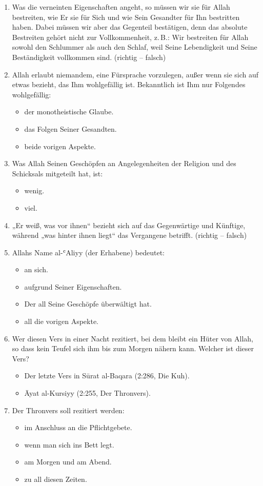 \begin{enumerate}[leftmargin=1.6em,resume]
\begin{itemize}
  \end{itemize}
\item Was die verneinten Eigenschaften angeht, so müssen wir sie für Allah bestreiten, wie Er sie
  für Sich und wie Sein Gesandter  für Ihn bestritten haben. Dabei müssen wir aber das
  Gegenteil bestätigen, denn das absolute Bestreiten gehört nicht zur Vollkommenheit, z.\,B.:
  Wir bestreiten für Allah sowohl den Schlummer als auch den Schlaf, weil Seine Lebendigkeit
  und Seine Beständigkeit vollkommen sind. (richtig -- falsch)
\item Allah erlaubt niemandem, eine Fürsprache vorzulegen, außer wenn sie sich auf etwas
  bezieht, das Ihm wohlgefällig ist. Bekanntlich ist Ihm nur Folgendes wohlgefällig:
  \begin{itemize}
    \item der monotheistische Glaube.
    \item das Folgen Seiner Gesandten.
    \item beide vorigen Aspekte.
  \end{itemize}
\item Was Allah Seinen Geschöpfen an Angelegenheiten der Religion und des Schicksals
  mitgeteilt hat, ist:
  \begin{itemize}
    \item wenig. \item viel.
  \end{itemize}
\item „Er weiß, was vor ihnen“ bezieht sich auf das Gegenwärtige und Künftige, während „was
  hinter ihnen liegt“ das Vergangene betrifft. (richtig -- falsch)
\item Allahs Name al-ʿAliyy (der Erhabene) bedeutet:
  \begin{itemize}
    \item an sich.
    \item aufgrund Seiner Eigenschaften.
    \item Der all Seine Geschöpfe überwältigt hat.
    \item all die vorigen Aspekte.
  \end{itemize}
\item Wer diesen Vers in einer Nacht rezitiert, bei dem bleibt ein Hüter von Allah, so dass kein
  Teufel sich ihm bis zum Morgen nähern kann. Welcher ist dieser Vers?
  \begin{itemize}
    \item Der letzte Vers in Sūrat al-Baqara (2:286, Die Kuh).
    \item Āyat al-Kursiyy (2:255, Der Thronvers).
  \end{itemize}
\item Der Thronvers soll rezitiert werden:
  \begin{itemize}
    \item im Anschluss an die Pflichtgebete.
    \item wenn man sich ins Bett legt.
    \item am Morgen und am Abend.
    \item zu all diesen Zeiten.
  \end{itemize}
\end{enumerate}

